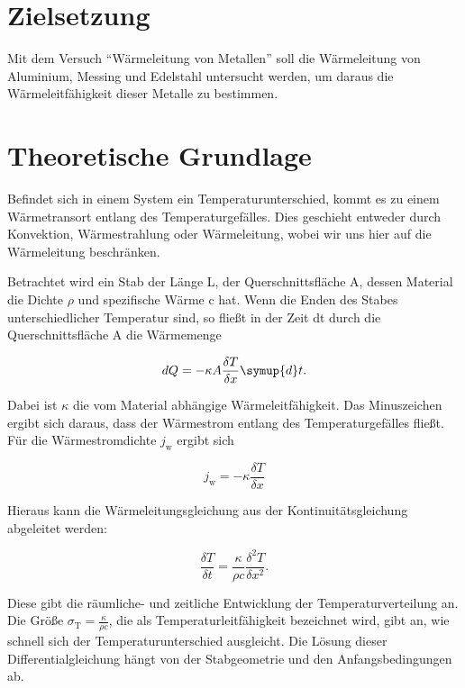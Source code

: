 \section{Zielsetzung}
    Mit dem Versuch "`Wärmeleitung von Metallen"' soll die Wärmeleitung von Aluminium, Messing und Edelstahl untersucht werden,
    um daraus die Wärmeleitfähigkeit dieser Metalle zu bestimmen.

    \section{Theoretische Grundlage}
      Befindet sich in einem System ein Temperaturunterschied, kommt es zu einem Wärmetransort entlang des Temperaturgefälles.
      Dies geschieht entweder durch Konvektion, Wärmestrahlung oder Wärmeleitung, wobei wir uns hier auf die Wärmeleitung beschränken.

      Betrachtet wird ein Stab der Länge L, der Querschnittsfläche A, dessen Material die Dichte $\rho$ und spezifische Wärme c hat. 
      Wenn die Enden des Stabes unterschiedlicher Temperatur sind, so fließt in der Zeit dt durch die Querschnittsfläche A die Wärmemenge

      \begin{equation}
      dQ = - \kappa A \frac{\delta T}{\delta x} \symup{d}t .
        \label{eqn:waermemenge}
      \end{equation}

      Dabei ist $\kappa$ die vom Material abhängige Wärmeleitfähigkeit. 
      Das Minuszeichen ergibt sich daraus, dass der Wärmestrom entlang des Temperaturgefälles fließt.
      Für die Wärmestromdichte $j_\text{w}$ ergibt sich

      \begin{equation}
      j_\text{w}=-\kappa \frac{\delta T}{\delta x}
        \label{eqn:waermestromdichte}
      \end{equation}       
      
      Hieraus kann die Wärmeleitungsgleichung aus der Kontinuitätsgleichung abgeleitet werden:

      \begin{equation}
      \frac{\delta T}{\delta t} = \frac{\kappa}{\rho c} \frac{\delta^2 T}{\delta x^2}.
        \label{eqn:waermeleitungsgleichung}
      \end{equation}  

      Diese gibt die räumliche- und zeitliche Entwicklung der Temperaturverteilung an.
      Die Größe $\sigma_\text{T} = \frac{\kappa}{\rho c}$, 
      die als Temperaturleitfähigkeit bezeichnet wird, gibt an, wie schnell sich der Temperaturunterschied ausgleicht.
      Die Lösung dieser Differentialgleichung hängt von der Stabgeometrie und den Anfangsbedingungen ab.


